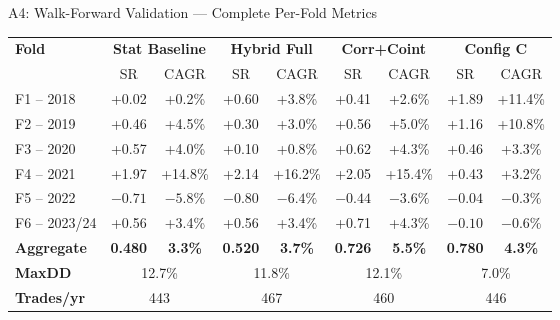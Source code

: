 \documentclass[aspectratio=169,10pt]{beamer}
\begin{document}
\begin{frame}{A4: Walk-Forward Validation --- Complete Per-Fold Metrics}
  \centering\scriptsize\renewcommand{\arraystretch}{1.3}
  \begin{tabular}{lcccccccc}
    \toprule
    \multirow{2}{*}{\textbf{Fold}} &
    \multicolumn{2}{c}{\textbf{Stat Baseline}} &
    \multicolumn{2}{c}{\textbf{Hybrid Full}} &
    \multicolumn{2}{c}{\textbf{Corr+Coint}} &
    \multicolumn{2}{c}{\textbf{Config C}} \\
    \cmidrule(lr){2-3}\cmidrule(lr){4-5}\cmidrule(lr){6-7}\cmidrule(lr){8-9}
    & SR & CAGR & SR & CAGR & SR & CAGR & SR & CAGR \\
    \midrule
    F1 -- 2018    & +0.02 & +0.2\%  & +0.60 & +3.8\% & +0.41 & +2.6\% & +1.89 & +11.4\% \\
    F2 -- 2019    & +0.46 & +4.5\%  & +0.30 & +3.0\% & +0.56 & +5.0\% & +1.16 & +10.8\% \\
    F3 -- 2020    & +0.57 & +4.0\%  & +0.10 & +0.8\% & +0.62 & +4.3\% & +0.46 & +3.3\% \\
    F4 -- 2021    & +1.97 & +14.8\% & +2.14 & +16.2\% & +2.05 & +15.4\% & +0.43 & +3.2\% \\
    F5 -- 2022    & $-0.71$ & $-5.8\%$ & $-0.80$ & $-6.4\%$ & $-0.44$ & $-3.6\%$ & $-0.04$ & $-0.3\%$ \\
    F6 -- 2023/24 & +0.56 & +3.4\%  & +0.56 & +3.4\% & +0.71 & +4.3\% & $-0.10$ & $-0.6\%$ \\
    \midrule
    \textbf{Aggregate} & \textbf{0.480} & \textbf{3.3\%} & \textbf{0.520} & \textbf{3.7\%}
                       & \textbf{0.726} & \textbf{5.5\%} & \textbf{0.780} & \textbf{4.3\%} \\
    \textbf{MaxDD} & \multicolumn{2}{c}{12.7\%} & \multicolumn{2}{c}{11.8\%}
                   & \multicolumn{2}{c}{12.1\%} & \multicolumn{2}{c}{7.0\%} \\
    \textbf{Trades/yr} & \multicolumn{2}{c}{443} & \multicolumn{2}{c}{467}
                       & \multicolumn{2}{c}{460} & \multicolumn{2}{c}{446} \\
    \bottomrule
  \end{tabular}
\end{frame}
\end{document}
